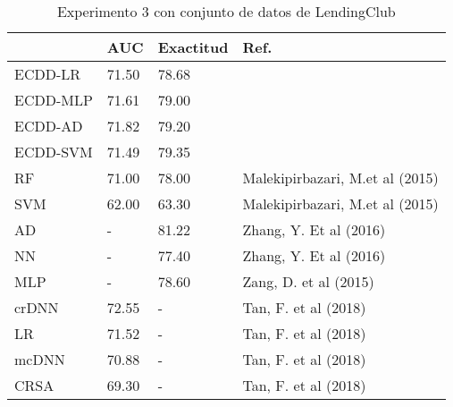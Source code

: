 \begin{table}[]
\centering
\caption{Experimento 3 con conjunto de datos de LendingClub}
\label{tab:lc-proc3}
\begin{tabularx}{\textwidth}{|l|Y Y l|}
				\hline
				& AUC			& Exactitud		& Ref.									\\
				\hline
ECDD-LR			& 71.50			& 78.68			&										\\		%
ECDD-MLP		& 71.61			& 79.00			&										\\		%
ECDD-AD			& 71.82			& 79.20			&										\\		%
ECDD-SVM		& 71.49			& 79.35			&										\\		%
				\hline
RF				& 71.00			& 78.00			& Malekipirbazari, M.et al (2015)		\\		%
SVM				& 62.00			& 63.30			& Malekipirbazari, M.et al (2015)		\\		%
AD				& -				& 81.22			& Zhang, Y. Et al (2016)				\\		%
NN				& -				& 77.40			& Zhang, Y. Et al (2016)				\\		%
MLP				& -				& 78.60			& Zang, D. et al (2015)					\\		%
crDNN			& 72.55			& -				& Tan, F. et al (2018)					\\		%
LR				& 71.52			& -				& Tan, F. et al (2018)					\\		%
mcDNN			& 70.88			& -				& Tan, F. et al (2018)					\\		%
CRSA			& 69.30			& -				& Tan, F. et al (2018)					\\		%
				\hline
\end{tabularx}
\par
\end{table}


